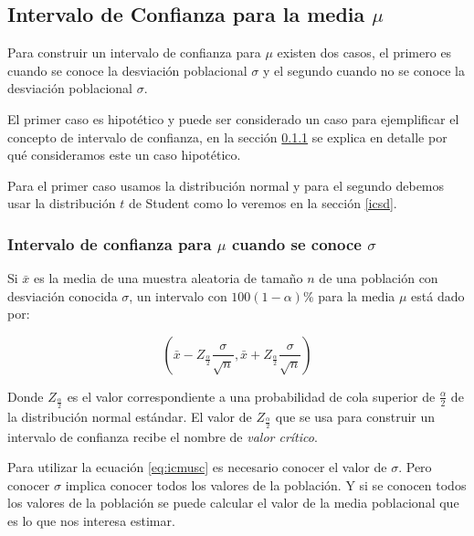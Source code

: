 \documentclass[letterpaper,]{book}
\begin{document}
\hypertarget{icmu}{%
\subsection{\texorpdfstring{Intervalo de Confianza para la media \(\mu\)}{Intervalo de Confianza para la media \textbackslash{}mu}}\label{icmu}}

Para construir un intervalo de confianza para \(\mu\) existen dos casos, el primero es cuando se conoce la desviación poblacional \(\sigma\) y el segundo cuando no se conoce la desviación poblacional \(\sigma\).

El primer caso es hipotético y puede ser considerado un caso para ejemplificar el concepto de intervalo de confianza, en la sección \ref{jt} se explica en detalle por qué consideramos este un caso hipotético.

Para el primer caso usamos la distribución normal y para el segundo debemos usar la distribución \(t\) de Student como lo veremos en la sección \ref{icsd}.

\hypertarget{jt}{%
\subsubsection{\texorpdfstring{Intervalo de confianza para \(\mu\) cuando se conoce \(\sigma\)}{Intervalo de confianza para \textbackslash{}mu cuando se conoce \textbackslash{}sigma}}\label{jt}}

Si \(\bar{x}\) es la media de una muestra aleatoria de tamaño \(n\) de una población con desviación conocida \(\sigma\), un intervalo con \(100\left(1-\alpha\right)\%\) para la media \(\mu\) está dado por:

\begin{equation} 
  \left(\bar{x} - Z_{\frac{\alpha}{2}}\dfrac{\sigma}{\sqrt{n}}, \bar{x} + Z_{\frac{\alpha}{2}}\dfrac{\sigma}{\sqrt{n}}  \right)
  \label{eq:icmusc}
\end{equation}

Donde \(Z_{\frac{\alpha}{2}}\) es el valor correspondiente a una probabilidad de cola superior de \(\frac{\alpha}{2}\) de la distribución normal estándar. El valor de \(Z_{\frac{\alpha}{2}}\) que se usa para construir un intervalo de confianza recibe el nombre de \emph{valor crítico}.

Para utilizar la ecuación \eqref{eq:icmusc} es necesario conocer el valor de \(\sigma\). Pero conocer \(\sigma\) implica conocer todos los valores de la población. Y si se conocen todos los valores de la población se puede calcular el valor de la media poblacional que es lo que nos interesa estimar.
\end{document}
